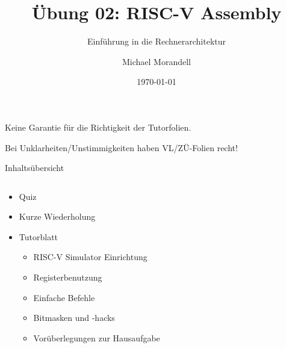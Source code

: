 \documentclass[
  german,            %
  aspectratio=169,    %
]{tumbeamer}
\title{Übung 02: RISC-V Assembly}
\subtitle{Einführung in die Rechnerarchitektur}
\author{Michael Morandell}
\institute{\theGroupName\\\theSchoolName\\\theUniversityName}
\date[\today]{\today}
\begin{document}
\maketitle

\begin{frame}[c]{}{}
  \begin{center}
    \LARGE  Keine Garantie für die Richtigkeit der Tutorfolien.

    \Large Bei Unklarheiten/Unstimmigkeiten haben VL/ZÜ-Folien recht!
  \end{center}
\end{frame}

\begin{frame}[c]{Inhaltsübersicht}{}
  \begin{columns}[c]
    \begin{column}{1\textwidth}
      \begin{itemize}
        \item Quiz
        \item Kurze Wiederholung
        \item Tutorblatt
        \begin{itemize}
          \item RISC-V Simulator Einrichtung
          \item Registerbenutzung
          \item Einfache Befehle
          \item Bitmasken und -hacks
          \item Vorüberlegungen zur Hausaufgabe
        \end{itemize}
      \end{itemize}
    \end{column}
  \end{columns}
\end{frame}
\end{document}
